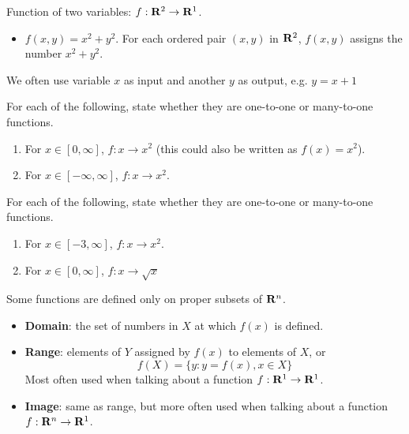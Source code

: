 \documentclass[]{book}
\providecommand{\tightlist}{%
  \setlength{\itemsep}{0pt}\setlength{\parskip}{0pt}}
\theoremstyle{definition}
\theoremstyle{definition}
\theoremstyle{definition}
\theoremstyle{remark}
\let\BeginKnitrBlock\begin \let\EndKnitrBlock\end
\begin{document}
Function of two variables: \(f: {\bf R}^2\to{\bf R}^1\).

\begin{itemize}
\tightlist
\item
  \(f(x,y)=x^2+y^2\). For each ordered pair \((x,y)\) in \({\bf R}^2\), \(f(x,y)\) assigns the number \(x^2+y^2\).
\end{itemize}

We often use variable \(x\) as input and another \(y\) as output, e.g. \(y=x+1\)

\BeginKnitrBlock{example}[Functions]
\protect\hypertarget{exm:functions}{}{\label{exm:functions} {} }
For each of the following, state whether they are one-to-one or many-to-one functions.

\begin{enumerate}
\def\labelenumi{\arabic{enumi}.}
\item
  For \(x \in [0,\infty]\), \(f : x \rightarrow x^2\) (this could also be written as \(f(x) = x^2\)).
\item
  For \(x \in [-\infty, \infty]\), \(f: x \rightarrow x^2\).
\end{enumerate}
\EndKnitrBlock{example}

\BeginKnitrBlock{exercise}[Functions]
\protect\hypertarget{exr:functions1}{}{\label{exr:functions1} {} }
For each of the following, state whether they are one-to-one or many-to-one functions.

\begin{enumerate}
\def\labelenumi{\arabic{enumi}.}
\item
  For \(x \in [-3, \infty]\), \(f: x \rightarrow x^2\).
\item
  For \(x \in [0, \infty]\), \(f: x \rightarrow \sqrt{x}\)
\end{enumerate}
\EndKnitrBlock{exercise}

Some functions are defined only on proper subsets of \({\bf R}^n\).

\begin{itemize}
\tightlist
\item
  \textbf{Domain}: the set of numbers in \(X\) at which \(f(x)\) is defined.
\item
  \textbf{Range}: elements of \(Y\) assigned by \(f(x)\) to elements of \(X\), or \[f(X)=\{ y : y=f(x), x\in X\}\]
  Most often used when talking about a function \(f:{\bf R}^1\to{\bf R}^1\).
\item
  \textbf{Image}: same as range, but more often used when talking about a function \(f:{\bf R}^n\to{\bf R}^1\).
\end{itemize}
\end{document}

